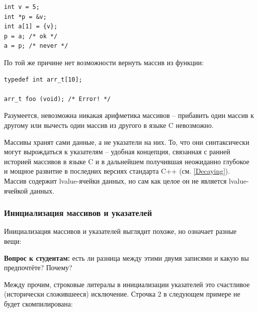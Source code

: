 \documentclass[a4paper,12pt,oneside]{article}
\newif\ifanswers
\begin{document}
\begin{lstlisting}
int v = 5;
int *p = &v;
int a[1] = {v};
p = a; /* ok */
a = p; /* never */
\end{lstlisting}

По той же причине нет возможности вернуть массив из функции:

\begin{lstlisting}
typedef int arr_t[10];

arr_t foo (void); /* Error! */
\end{lstlisting}

Разумеется, невозможна никакая арифметика массивов -- прибавить один массив к другому или вычесть один массив из другого в языке C невозможно.

Массивы хранят сами данные, а не указатели на них. То, что они синтаксически могут вырождаться к указателям -- удобная концепция, связанная с ранней историей массивов в языке C и в дальнейшем получившая неожиданно глубокое и мощное развитие в последних версиях стандарта C++ (см. \ref{Decaying}). Массив содержит lvalue-ячейки данных, но сам как целое он не является lvalue-ячейкой данных.

\subsubsection{Инициализация массивов и указателей}

Инициализация массивов и указателей выглядит похоже, но означает разные вещи:



\textbf{Вопрос к студентам:} есть ли разница между этими двумя записями и какую вы предпочтёте? Почему?

\ifanswers
Верный ответ: строчка 1 предпочтительней, чем (устаревшая, с Wall + Werror выдаст ``error: deprecated conversion from string constant to \lstinline!char*!'') строчка 2 и они имеют разную семантику. Память под массивы выделяется автоматически (и строчка 1 подразумевает неявный memset) но память никогда автоматически не выделяется под указатели, поэтому для построения динамических структур данных (например, связных списков) используются указатели, а не массивы.
\fi

Между прочим, строковые литералы в инициализации указателей это счастливое (исторически сложившееся) исключение. Строчка 2 в следующем примере не будет скомпилирована:


\end{document}
